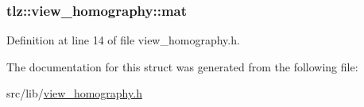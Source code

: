 \subsubsection[{\texorpdfstring{mat}{mat}}]{ tlz\+::view\+\_\+homography\+::mat}\hypertarget{structtlz_1_1view__homography_ac1e52bf8cd63adbfb89179c618fbe9d3}{}\label{structtlz_1_1view__homography_ac1e52bf8cd63adbfb89179c618fbe9d3}


Definition at line 14 of file view\+\_\+homography.\+h.



The documentation for this struct was generated from the following file\+:\begin{DoxyCompactItemize}
\item 
src/lib/\hyperlink{view__homography_8h}{view\+\_\+homography.\+h}\end{DoxyCompactItemize}
